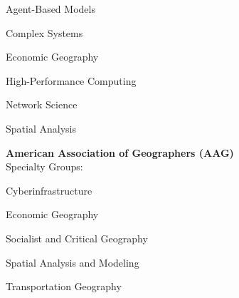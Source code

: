 \documentclass{acmresume}
\begin{document}
		\vspace{-.25cm}

    \begin{multicols}{3}
    	\begin{titemize}
    		\item Agent-Based Models
    		\item Complex Systems
    		\item Economic Geography
    		\item High-Performance Computing
    		\item Network Science
    		\item Spatial Analysis
    	\end{titemize}
    \end{multicols}


    \textbf{American Association of Geographers (AAG)} \\
    Specialty Groups: \\ \vspace{-.3cm}
    \begin{multicols}{3}
    \begin{titemize}
        \item Cyberinfrastructure
        \item Economic Geography
        \item Socialist and Critical Geography
        \item Spatial Analysis and Modeling
        \item Transportation Geography
    \end{titemize}
    \end{multicols}
\end{document}
